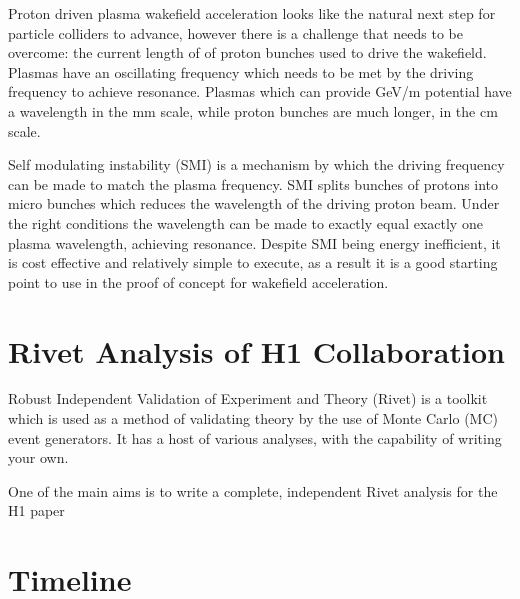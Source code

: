 \documentclass[journal, a4paper,11pt]{IEEEtran}
\begin{document}
Proton driven plasma wakefield acceleration looks like the natural next step for particle colliders to advance, however there is a challenge that needs to be overcome: the current length of of proton bunches used to drive the wakefield. Plasmas have an oscillating frequency which needs to be met by the driving frequency to achieve resonance. Plasmas which can provide GeV/m potential have a wavelength in the mm scale, while proton bunches are much longer, in the cm scale.

Self modulating instability (SMI) is a mechanism by which the driving frequency can be made to match the plasma frequency. SMI splits bunches of protons into micro bunches which reduces the wavelength of the driving proton beam. Under the right conditions the wavelength can be made to exactly equal exactly one plasma wavelength, achieving resonance. Despite SMI being energy inefficient, it is cost effective and relatively simple to execute, as a result it is a good starting point to use in the proof of concept for wakefield acceleration.

\section{Rivet Analysis of H1 Collaboration}

Robust Independent Validation of Experiment and Theory (Rivet) is a toolkit which is used as a method of validating theory by the use of Monte Carlo (MC) event generators. It has a host of various analyses, with the capability of writing your own. 

One of the main aims is to write a complete, independent Rivet analysis for the H1 paper \cite{H1}



\section{Timeline}




\end{document}

